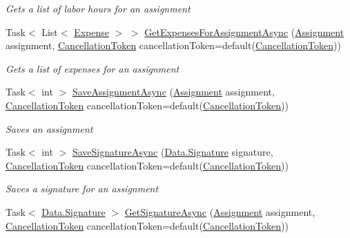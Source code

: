 \begin{DoxyCompactItemize}
\begin{DoxyCompactList}\small\item\em Gets a list of labor hours for an assignment \end{DoxyCompactList}\item 
Task$<$ List$<$ \hyperlink{class_field_service_1_1_data_1_1_expense}{Expense} $>$ $>$ \hyperlink{interface_field_service_1_1_i_assignment_service_a58bbf53e8902cc8b5b2febe3f8d86a66}{Get\+Expenses\+For\+Assignment\+Async} (\hyperlink{class_field_service_1_1_data_1_1_assignment}{Assignment} assignment, \hyperlink{_view_models_2_assignment_view_model_8cs_aba80ec766846c61f55644fd23860cb18}{Cancellation\+Token} cancellation\+Token=default(\hyperlink{_view_models_2_assignment_view_model_8cs_aba80ec766846c61f55644fd23860cb18}{Cancellation\+Token}))
\begin{DoxyCompactList}\small\item\em Gets a list of expenses for an assignment \end{DoxyCompactList}\item 
Task$<$ int $>$ \hyperlink{interface_field_service_1_1_i_assignment_service_ad9c79c58d246aea349ba9b7f022ff1ba}{Save\+Assignment\+Async} (\hyperlink{class_field_service_1_1_data_1_1_assignment}{Assignment} assignment, \hyperlink{_view_models_2_assignment_view_model_8cs_aba80ec766846c61f55644fd23860cb18}{Cancellation\+Token} cancellation\+Token=default(\hyperlink{_view_models_2_assignment_view_model_8cs_aba80ec766846c61f55644fd23860cb18}{Cancellation\+Token}))
\begin{DoxyCompactList}\small\item\em Saves an assignment \end{DoxyCompactList}\item 
Task$<$ int $>$ \hyperlink{interface_field_service_1_1_i_assignment_service_aaf826d808c6a94f4695e8d971d6ac59a}{Save\+Signature\+Async} (\hyperlink{class_field_service_1_1_data_1_1_signature}{Data.\+Signature} signature, \hyperlink{_view_models_2_assignment_view_model_8cs_aba80ec766846c61f55644fd23860cb18}{Cancellation\+Token} cancellation\+Token=default(\hyperlink{_view_models_2_assignment_view_model_8cs_aba80ec766846c61f55644fd23860cb18}{Cancellation\+Token}))
\begin{DoxyCompactList}\small\item\em Saves a signature for an assignment \end{DoxyCompactList}\item 
Task$<$ \hyperlink{class_field_service_1_1_data_1_1_signature}{Data.\+Signature} $>$ \hyperlink{interface_field_service_1_1_i_assignment_service_a7852d89fcda603f58224f0957743f2dd}{Get\+Signature\+Async} (\hyperlink{class_field_service_1_1_data_1_1_assignment}{Assignment} assignment, \hyperlink{_view_models_2_assignment_view_model_8cs_aba80ec766846c61f55644fd23860cb18}{Cancellation\+Token} cancellation\+Token=default(\hyperlink{_view_models_2_assignment_view_model_8cs_aba80ec766846c61f55644fd23860cb18}{Cancellation\+Token}))

\end{DoxyCompactItemize}
